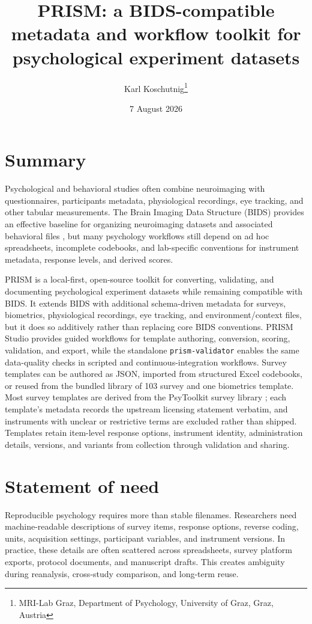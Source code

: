 \documentclass[
]{article}
\title{PRISM: a BIDS-compatible metadata and workflow toolkit for
psychological experiment datasets}
\author{Karl Koschutnig\thanks{MRI-Lab Graz, Department of Psychology, University of Graz, Graz, Austria}}
\date{7 August 2026}
\begin{document}
\maketitle

\section{Summary}\label{summary}

Psychological and behavioral studies often combine neuroimaging with
questionnaires, participants metadata, physiological recordings, eye
tracking, and other tabular measurements. The Brain Imaging Data
Structure (BIDS) provides an effective baseline for organizing
neuroimaging datasets and associated behavioral files
\citep{gorgolewski2016bids}, but many psychology workflows still depend
on ad hoc spreadsheets, incomplete codebooks, and lab-specific
conventions for instrument metadata, response levels, and derived
scores.

PRISM is a local-first, open-source toolkit for converting, validating,
and documenting psychological experiment datasets while remaining
compatible with BIDS. It extends BIDS with additional schema-driven
metadata for surveys, biometrics, physiological recordings, eye
tracking, and environment/context files, but it does so additively
rather than replacing core BIDS conventions. PRISM Studio provides
guided workflows for template authoring, conversion, scoring,
validation, and export, while the standalone \texttt{prism-validator}
enables the same data-quality checks in scripted and
continuous-integration workflows. Survey templates can be authored as
JSON, imported from structured Excel codebooks, or reused from the
bundled library of 103 survey and one biometrics template. Most survey
templates are derived from the PsyToolkit survey library
\citep{stoet2010psytoolkit,stoet2017psytoolkit}; each template's
metadata records the upstream licensing statement verbatim, and
instruments with unclear or restrictive terms are excluded rather than
shipped. Templates retain item-level response options, instrument
identity, administration details, versions, and variants from
collection through validation and sharing.

\section{Statement of need}\label{statement-of-need}

Reproducible psychology requires more than stable filenames. Researchers
need machine-readable descriptions of survey items, response options,
reverse coding, units, acquisition settings, participant variables, and
instrument versions. In practice, these details are often scattered
across spreadsheets, survey platform exports, protocol documents, and
manuscript drafts. This creates ambiguity during reanalysis, cross-study
comparison, and long-term reuse.
\end{document}
